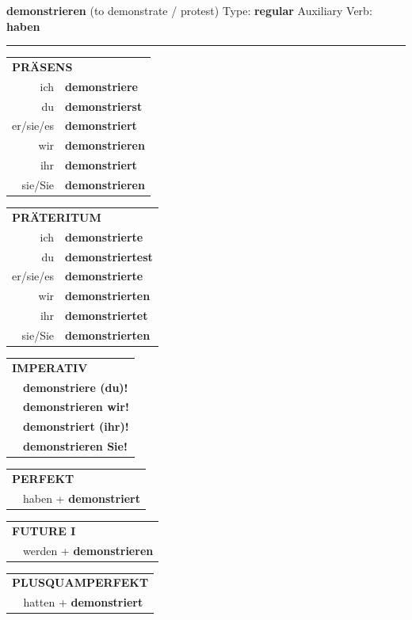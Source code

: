 \documentclass[10pt,a4paper]{revtex4-2}
\begin{document}
\begin{verbbox}
{\Large \bf demonstrieren} (to demonstrate / protest) \hfill Type: \textbf{regular} \hfill Auxiliary Verb: \textbf{haben}

\vspace{5pt}
\hrule
\vspace{5pt}

\begin{tabular}{rl}
\multicolumn{2}{l}{\textbf{PRÄSENS}}\\
ich & \textbf{demonstriere}\\
du & \textbf{demonstrierst}\\
er/sie/es & \textbf{demonstriert}\\
wir & \textbf{demonstrieren}\\
ihr & \textbf{demonstriert}\\
sie/Sie & \textbf{demonstrieren}\\
\end{tabular}
\hfill
\begin{tabular}{rl}
\multicolumn{2}{l}{\textbf{PRÄTERITUM}}\\
ich & \textbf{demonstrierte}\\
du & \textbf{demonstriertest}\\
er/sie/es & \textbf{demonstrierte}\\
wir & \textbf{demonstrierten}\\
ihr & \textbf{demonstriertet}\\
sie/Sie & \textbf{demonstrierten}\\
\end{tabular}
\hfill
\begin{tabular}{rl}
\multicolumn{2}{l}{\textbf{IMPERATIV}}\\
& \textbf{demonstriere (du)!}\\
& \textbf{demonstrieren wir!}\\
& \textbf{demonstriert (ihr)!}\\
& \textbf{demonstrieren Sie!}\\
\end{tabular}

\vspace{10pt}

\begin{tabular}{rl}
\multicolumn{2}{l}{\textbf{PERFEKT}}\\
& haben + \textbf{demonstriert}\\
\end{tabular}
\hfill
\begin{tabular}{rl}
\multicolumn{2}{l}{\textbf{FUTURE I}}\\
& werden + \textbf{demonstrieren}\\
\end{tabular}
\hfill
\begin{tabular}{rl}
\multicolumn{2}{l}{\textbf{PLUSQUAMPERFEKT}}\\
& hatten + \textbf{demonstriert}\\
\end{tabular}


\end{verbbox}
\end{document}
